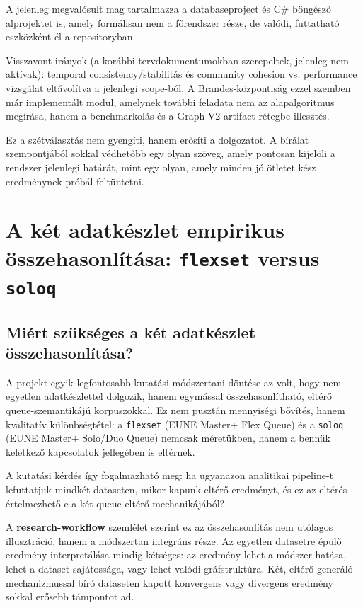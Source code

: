 ﻿\documentclass[a4paper,12pt]{report}
\begin{document}
A jelenleg megvalósult mag tartalmazza a databaseproject és C\# böngésző alprojektet is, amely formálisan nem a főrendszer része, de valódi, futtatható eszközként él a repositoryban.

Visszavont irányok (a korábbi tervdokumentumokban szerepeltek, jelenleg nem aktívak): temporal consistency/stabilitás és community cohesion vs. performance vizsgálat eltávolítva a jelenlegi scope-ból. A Brandes-központiság ezzel szemben már implementált modul, amelynek további feladata nem az alapalgoritmus megírása, hanem a benchmarkolás és a Graph V2 artifact-rétegbe illesztés.

Ez a szétválasztás nem gyengíti, hanem erősíti a dolgozatot. A bírálat szempontjából sokkal védhetőbb egy olyan szöveg, amely pontosan kijelöli a rendszer jelenlegi határát, mint egy olyan, amely minden jó ötletet kész eredménynek próbál feltüntetni.

\chapter{A két adatkészlet empirikus összehasonlítása: \texttt{flexset} versus \texttt{soloq}}

\section{Miért szükséges a két adatkészlet összehasonlítása?}

A projekt egyik legfontosabb kutatási-módszertani döntése az volt, hogy nem egyetlen adatkészlettel dolgozik, hanem egymással összehasonlítható, eltérő queue-szemantikájú korpuszokkal. Ez nem pusztán mennyiségi bővítés, hanem kvalitatív különbségtétel: a \texttt{flexset} (EUNE Master$+$ Flex Queue) és a \texttt{soloq} (EUNE Master$+$ Solo/Duo Queue) nemcsak méretükben, hanem a bennük keletkező kapcsolatok jellegében is eltérnek.

A kutatási kérdés így fogalmazható meg: ha ugyanazon analitikai pipeline-t lefuttatjuk mindkét dataseten, mikor kapunk eltérő eredményt, és ez az eltérés értelmezhető-e a két queue eltérő mechanikájából?

A \textbf{research-workflow} szemlélet szerint ez az összehasonlítás nem utólagos illusztráció, hanem a módszertan integráns része. Az egyetlen datasetre épülő eredmény interpretálása mindig kétséges: az eredmény lehet a módszer hatása, lehet a dataset sajátossága, vagy lehet valódi gráfstruktúra. Két, eltérő generáló mechanizmussal bíró dataseten kapott konvergens vagy divergens eredmény sokkal erősebb támpontot ad.
\end{document}
